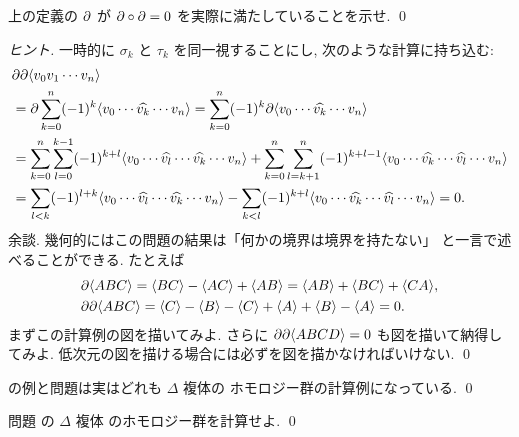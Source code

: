 \documentclass[12pt,twoside]{jarticle}
\begin{document}
\begin{question}
\label{q:dd=0}
 上の定義の $\partial$ が $\partial\circ\partial=0$ を実際に満たしていることを示せ.
 \qed
\end{question}

\begin{proof}[ヒント]
 一時的に $\sigma_k$ と $\tau_k$ を同一視することにし, 
 次のような計算に持ち込む:
 \begin{align*}
  &
  \partial\partial\langle v_0v_1\cdots v_n\rangle
  \\ &
  = \partial\sum_{k=0}^n (-1)^k \langle v_0\cdots\widehat{v_k}\cdots v_n\rangle
  = \sum_{k=0}^n (-1)^k \partial\langle v_0\cdots\widehat{v_k}\cdots v_n\rangle
  \\ &
  = \sum_{k=0}^n \sum_{l=0}^{k-1}
     (-1)^{k+l}   \langle v_0\cdots\widehat{v_l}\cdots\widehat{v_k}\cdots v_n\rangle
  + \sum_{k=0}^n \sum_{l=k+1}^{n}
     (-1)^{k+l-1} \langle v_0\cdots\widehat{v_k}\cdots\widehat{v_l}\cdots v_n\rangle
  \\ &
  = \sum_{l<k}
     (-1)^{l+k}   \langle v_0\cdots\widehat{v_l}\cdots\widehat{v_k}\cdots v_n\rangle
  - \sum_{k<l}
     (-1)^{k+l} \langle v_0\cdots\widehat{v_k}\cdots\widehat{v_l}\cdots v_n\rangle
  = 0.
 \end{align*}
 余談. 幾何的にはこの問題の結果は「何かの境界は境界を持たない」
 と一言で述べることができる. たとえば
 \begin{align*}
  &
  \partial\langle ABC\rangle 
  = \langle BC\rangle - \langle AC\rangle + \langle AB\rangle
  = \langle AB\rangle + \langle BC\rangle + \langle CA\rangle,
  \\ &
  \partial\partial\langle ABC\rangle 
  = \langle C\rangle - \langle B\rangle
  - \langle C\rangle + \langle A\rangle
  + \langle B\rangle - \langle A\rangle
  = 0.
 \end{align*}
 まずこの計算例の図を描いてみよ. 
 さらに $\partial\partial\langle ABCD\rangle=0$ も図を描いて納得してみよ.
 低次元の図を描ける場合には必ずを図を描かなければいけない.
 \qed
\end{proof}

\begin{example}
 の例と問題は実はどれも $\Delta$ 複体の
 ホモロジー群の計算例になっている.
 \qed
\end{example}

\begin{question}
\label{q:dunce-cap-homology}
 問題  の $\Delta$ 複体
 のホモロジー群を計算せよ.
 \qed
\end{question}
\end{document}
